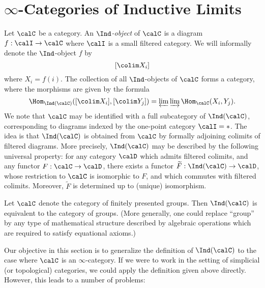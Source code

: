 \section{$\infty$-Categories of Inductive Limits}\label{c5s3}

\setcounter{theorem}{0}

Let $\calC$ be a category. An {\it $\Ind$-object} of $\calC$ is a diagram
$f: \calI \rightarrow \calC$ where $\calI$ is a small filtered category. We will informally denote the $\Ind$-object $f$ by $$ [\colim X_i] $$
where $X_i = f(i)$. The collection of all $\Ind$-objects of $\calC$ forms a category, where
the morphisms are given by the formula
$$ \Hom_{\Ind(\calC)}( [\colim X_i], [\colim Y_j]) =
\varprojlim \varinjlim \Hom_{\calC}(X_i, Y_j).$$
We note that $\calC$ may be identified with a full subcategory of $\Ind(\calC)$, corresponding
to diagrams indexed by the one-point category $\calI = \ast$. 
The idea is that $\Ind(\calC)$ is obtained from $\calC$ by formally adjoining colimits of filtered diagrams. More precisely, $\Ind(\calC)$ may be described by the following universal property:
for any category $\calD$ which admits filtered colimits, and any functor $F: \calC \rightarrow \calD$, there exists a functor $\widetilde{F}: \Ind(\calC) \rightarrow \calD$, whose restriction to $\calC$ is isomorphic to $F$, and which commutes with filtered colimits. Moreover, $\widetilde{F}$ is determined up to (unique) isomorphism.

\begin{example}
Let $\calC$ denote the category of finitely presented groups. Then $\Ind(\calC)$ is equivalent to the category of groups. (More generally, one could replace ``group'' by any type of mathematical structure described by algebraic operations which are required to satisfy equational axioms.)
\end{example}

Our objective in this section is to generalize the definition of $\Ind(\calC)$ to the case where $\calC$ is an $\infty$-category. If we were to work in the setting of simplicial (or topological) categories, we could apply the definition given above directly. However, this leads to a number of problems:

